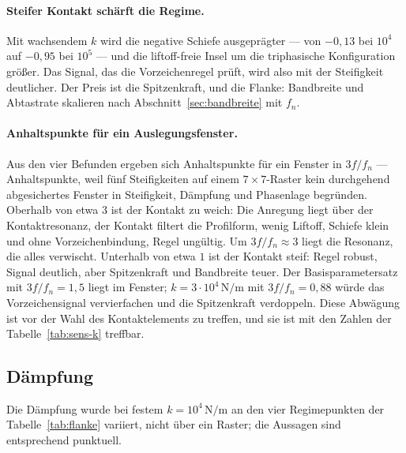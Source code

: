 \documentclass[12pt,a4paper]{report}
\begin{document}
\paragraph{Steifer Kontakt schärft die Regime.}
Mit wachsendem $k$ wird die negative Schiefe ausgeprägter --- von
$-0{,}13$ bei $10^{4}$ auf $-0{,}95$ bei $10^{5}$ --- und die
liftoff-freie Insel um die triphasische Konfiguration größer. Das
Signal, das die Vorzeichenregel prüft, wird also mit der Steifigkeit
deutlicher. Der Preis ist die Spitzenkraft, und die Flanke: Bandbreite
und Abtastrate skalieren nach Abschnitt~\ref{sec:bandbreite} mit $f_n$.

\paragraph{Anhaltspunkte für ein Auslegungsfenster.}
Aus den vier Befunden ergeben sich Anhaltspunkte für ein Fenster in
$3f/f_n$ --- Anhaltspunkte, weil fünf Steifigkeiten auf einem
$7\times7$-Raster kein durchgehend abgesichertes Fenster in Steifigkeit,
Dämpfung und Phasenlage begründen. Oberhalb von etwa
$3$ ist der Kontakt zu weich: Die Anregung liegt über der
Kontaktresonanz, der Kontakt filtert die Profilform, wenig Liftoff,
Schiefe klein und ohne Vorzeichenbindung, Regel ungültig. Um $3f/f_n \approx 3$ liegt die
Resonanz, die alles verwischt. Unterhalb von etwa $1$ ist der Kontakt
steif: Regel robust, Signal deutlich, aber Spitzenkraft und Bandbreite
teuer. Der Basisparametersatz mit $3f/f_n = 1{,}5$ liegt im Fenster;
$k = 3\cdot10^{4}\,\mathrm{N/m}$ mit $3f/f_n = 0{,}88$ würde das
Vorzeichensignal vervierfachen und die Spitzenkraft verdoppeln. Diese
Abwägung ist vor der Wahl des Kontaktelements zu treffen, und sie ist
mit den Zahlen der Tabelle~\ref{tab:sens-k} treffbar.

\subsection*{Dämpfung}

Die Dämpfung wurde bei festem $k = 10^{4}\,\mathrm{N/m}$ an den vier
Regimepunkten der Tabelle~\ref{tab:flanke} variiert, nicht über ein
Raster; die Aussagen sind entsprechend punktuell.
\end{document}
